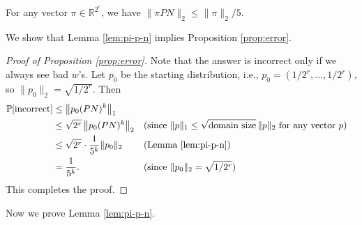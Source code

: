 \documentclass[letterpaper, reqno,11pt]{article}
\newcommand{\RR}{\mathbb{R}}
\newcommand{\PP}{\mathop{{}\mathbb{P}}}
\begin{document}
\begin{lemma} \label{lem:pi-p-n}
  For any vector $\pi \in \RR^{2^r}$, we have $\| \pi PN \|_2 \leq \| \pi \|_2/5$.
\end{lemma}

We show that Lemma \ref{lem:pi-p-n} implies Proposition \ref{prop:error}.

\begin{proof}[Proof of Proposition \ref{prop:error}]
  Note that the answer is incorrect only if we always see bad $w$'s. Let $p_0$ be the starting distribution, i.e., $p_0 = (1/2^r, \ldots, 1/2^r)$, so $\| p_0 \|_2 = \sqrt{1/2^r}$. Then
  \begin{align*}
    \PP[\text{incorrect}] &\leq \left\| p_0 (PN)^k \right\|_1 \\
    &\leq \sqrt{2^r} \left\| p_0 (PN)^k \right\|_2 && \text{(since $\| p \|_1 \leq \sqrt{\text{domain size}} \, \| p \|_2$ for any vector $p$)} \\
    &\leq \sqrt{2^r} \cdot \frac{1}{5^k} \| p_0 \|_2 && \text{(Lemma \ref{lem:pi-p-n})} \\
    &= \frac{1}{5^k}. && \text{(since $\| p_0 \|_2 = \sqrt{1/2^r}$)}
  \end{align*}
  This completes the proof.
\end{proof}

Now we prove Lemma \ref{lem:pi-p-n}.
\end{document}

